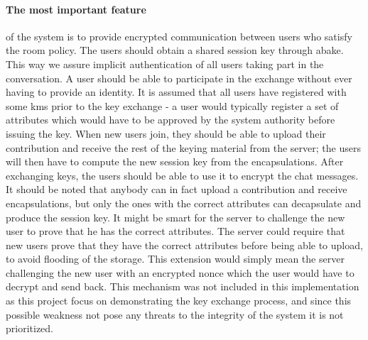 \paragraph{The most important feature} of the system is to provide encrypted communication between users who satisfy the room policy. The users should obtain a shared session key through \gls{abake}. This way we assure implicit authentication of all users taking part in the conversation. A user should be able to participate in the exchange without ever having to provide an identity. It is assumed that all users have registered with some \gls{kms} prior to the key exchange - a user would typically register a set of attributes which would have to be approved by the system authority before issuing the key. When new users join, they should be able to upload their contribution and receive the rest of the keying material from the server; the users will then have to compute the new session key from the encapsulations. After exchanging keys, the users should be able to use it to encrypt the chat messages. It should be noted that anybody can in fact upload a contribution and receive encapsulations, but only the ones with the correct attributes can decapsulate and produce the session key. It might be smart for the server to challenge the new user to prove that he has the correct attributes. The server could require that new users prove that they have the correct attributes before being able to upload, to avoid flooding of the storage. This extension would simply mean the server challenging the new user with an encrypted nonce which the user would have to decrypt and send back. This mechanism was not included in this implementation as this project focus on demonstrating the key exchange process, and since this possible weakness not pose any threats to the integrity of the system it is not prioritized. 


